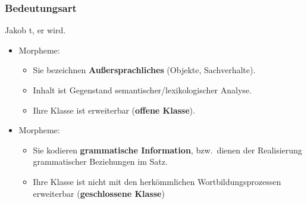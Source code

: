 \begin{frame}
\frametitle{Bedeutungsart}


\ea Jakob t,  er    wird.
\z

\begin{itemize}
	\item {} Morpheme:
	\begin{itemize}
		\item Sie bezeichnen \textbf{Außersprachliches} (Objekte, Sachverhalte). 
		
		\item Inhalt ist Gegenstand semantischer/lexikologischer Analyse.
		
		\item Ihre Klasse ist erweiterbar (\textbf{offene Klasse}).
	
	\end{itemize}

\pause 
		
	\item {} Morpheme:
	
	\begin{itemize}
		\item Sie kodieren \textbf{grammatische Information}, bzw.\ dienen der Realisierung grammatischer Beziehungen im Satz.
		
		\item Ihre Klasse ist nicht mit den herkömmlichen Wortbildungsprozessen erweiterbar (\textbf{geschlossene Klasse})
	
	\end{itemize}
\end{itemize}

\end{frame}


